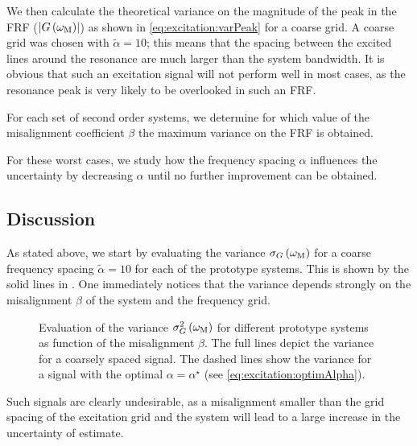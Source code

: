   We then calculate the theoretical variance on the magnitude of the peak in the \gls{FRF} ($\left| G\left( \omega_{\mathrm{M}} \right) \right|$) as shown in \eqref{eq:excitation:varPeak} for a coarse grid.
  A coarse grid was chosen with $\tilde{\alpha} = 10$; this means that the spacing between the excited lines around the resonance are much larger than the system bandwidth.
  It is obvious that such an excitation signal will not perform well in most cases, as the resonance peak is very likely to be overlooked in such an \gls{FRF}.
  
  For each set of second order systems, we determine for which value of the misalignment coefficient $\beta$ the maximum variance on the FRF is obtained.
  
  For these worst cases, we study how the frequency spacing $\alpha$ influences the uncertainty by decreasing $\alpha$ until no further improvement can be obtained.

  \subsection{Discussion} 
  \label{sec:excitation:bestFrequencyResolution}
  As stated above, we start by evaluating the variance $\sigma_G\left( \omega_{\mathrm{M}}\right)$ for a coarse frequency spacing $\tilde{\alpha} = 10$ for each of the prototype systems.
  This is shown by the solid lines in .
  One immediately notices that the variance depends strongly on the misalignment $\beta$ of the system and the frequency grid.
  
  \begin{figure}
    \centering
      \setlength{}
      \setlength\figureheight{0.68\figurewidth}
    
    \caption[Variance $\sigma_G^2\left( \wM \right)$ as a function of the grid misalignment coefficient $\beta$.]{Evaluation of the variance $\sigma_G^2\left( \wM \right) $ for different prototype systems as function of the misalignment $\beta$.
             The full lines depict the variance for a coarsely spaced signal.
             The dashed lines show the variance for a signal with the optimal $\alpha = \alpha^{\star}$ (see \eqref{eq:excitation:optimAlpha}).}
    \label{fig:excitation:worstCaseBeta}
  \end{figure}

  Such signals are clearly undesirable, as a misalignment smaller than the grid spacing of the excitation grid and the system will lead to a large increase in the uncertainty of estimate.
  
